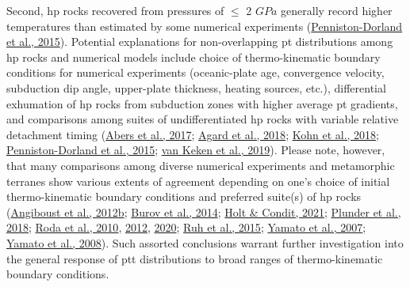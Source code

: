 Second, \gls{hp} rocks recovered from pressures of \(\leq\) 2 \(GPa\) generally record higher temperatures than estimated by some numerical experiments (\protect\hyperlink{ref-penniston2015}{Penniston-Dorland et al., 2015}). Potential explanations for non-overlapping \gls{pt} distributions among \gls{hp} rocks and numerical models include choice of thermo-kinematic boundary conditions for numerical experiments (oceanic-plate age, convergence velocity, subduction dip angle, upper-plate thickness, heating sources, etc.), differential exhumation of \gls{hp} rocks from subduction zones with higher average \gls{pt} gradients, and comparisons among suites of undifferentiated \gls{hp} rocks with variable relative detachment timing (\protect\hyperlink{ref-abers2017}{Abers et al., 2017}; \protect\hyperlink{ref-agard2018}{Agard et al., 2018}; \protect\hyperlink{ref-kohn2018}{Kohn et al., 2018}; \protect\hyperlink{ref-penniston2015}{Penniston-Dorland et al., 2015}; \protect\hyperlink{ref-vankeken2019}{van Keken et al., 2019}). Please note, however, that many comparisons among diverse numerical experiments and metamorphic terranes show various extents of agreement depending on one's choice of initial thermo-kinematic boundary conditions and preferred suite(s) of \gls{hp} rocks (\protect\hyperlink{ref-angiboust2012b}{Angiboust et al., 2012b}; \protect\hyperlink{ref-burov2014}{Burov et al., 2014}; \protect\hyperlink{ref-holt2021}{Holt \& Condit, 2021}; \protect\hyperlink{ref-plunder2018}{Plunder et al., 2018}; \protect\hyperlink{ref-roda2010}{Roda et al., 2010}, \protect\hyperlink{ref-roda2012}{2012}, \protect\hyperlink{ref-roda2020}{2020}; \protect\hyperlink{ref-ruh2015}{Ruh et al., 2015}; \protect\hyperlink{ref-yamato2007}{Yamato et al., 2007}; \protect\hyperlink{ref-yamato2008}{Yamato et al., 2008}). Such assorted conclusions warrant further investigation into the general response of \gls{ptt} distributions to broad ranges of thermo-kinematic boundary conditions.



